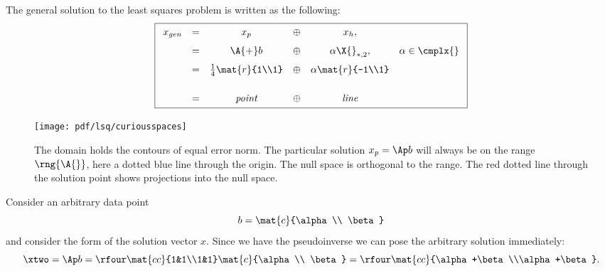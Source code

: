 The general solution to the least squares problem is written as the following:
\begin{equation}
\boxed{
  \begin{array}{rccccc}
    x_{gen} &=& x_{p} &\oplus& x_{h},\\[7pt]
      &=& \A{+}b &\oplus& \alpha \X{}_{*,2}, & \alpha\in\cmplx{}\\[7pt]
      &=& \frac{1}{4}\mat{r}{1\\1} &\oplus& \alpha \mat{r}{-1\\1}\\[17pt]
      &=& \textit{point} &\oplus& \textit{line}
  \end{array}
}
\label{eq:simple:fullsoln}
\end{equation}

\begin{figure}[htbp] %
   \centering
   \texttt{[image: pdf/lsq/curiousspaces]} 
   \caption[The domain holds the contours of equal error norm]{The domain holds the contours of equal error norm. The particular solution $x_{p}=\Ap b$ will always be on the range $\rng{\A{}}$, here a dotted blue line through the origin. The null space is orthogonal to the range. The red dotted line through the solution point shows projections into the null space.}
   \label{fig:curious:no:contour}
\end{figure}

Consider an arbitrary data point
\begin{equation}
  b = \mat{c}{\alpha \\ \beta}
  \label{eq:curious:no:data}
\end{equation}
and consider the form of the solution vector $x$. Since we have the pseudoinverse we can pose the arbitrary solution immediately:
\begin{equation}
  \xtwo = \Ap b = \rfour \mat{cc}{1&1\\1&1}\mat{c}{\alpha \\ \beta} = \rfour\mat{cc}{\alpha+\beta\\\alpha+\beta}.
\end{equation}


